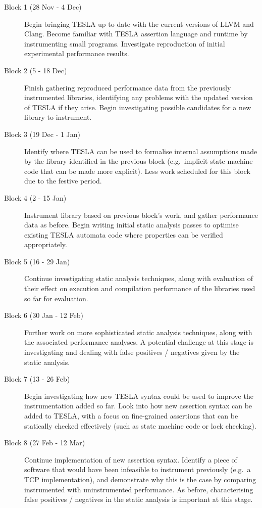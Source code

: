 \documentclass[11pt]{article}
\begin{document}
\begin{description}
  \item[Block 1 (28 Nov - 4 Dec)] Begin bringing TESLA up to date with the current
    versions of LLVM and Clang. Become familiar with TESLA assertion language and runtime
    by instrumenting small programs. Investigate reproduction of initial experimental
    performance results.

  \item[Block 2 (5 - 18 Dec)] Finish gathering reproduced performance data from the
    previously instrumented libraries, identifying any problems with the updated version
    of TESLA if they arise. Begin investigating possible candidates for a new library to
    instrument.

  \item[Block 3 (19 Dec - 1 Jan)] Identify where TESLA can be used to formalise internal
    assumptions made by the library identified in the previous block (e.g.\ implicit state
    machine code that can be made more explicit). Less work scheduled for this block due
    to the festive period.

  \item[Block 4 (2 - 15 Jan)] Instrument library based on previous block's work, and
    gather performance data as before. Begin writing initial static analysis passes to
    optimise existing TESLA automata code where properties can be verified appropriately.

  \item[Block 5 (16 - 29 Jan)] Continue investigating static analysis techniques, along
    with evaluation of their effect on execution and compilation performance of the
    libraries used so far for evaluation. 

  \item[Block 6 (30 Jan - 12 Feb)] Further work on more sophisticated static analysis
    techniques, along with the associated performance analyses. A potential challenge at
    this stage is investigating and dealing with false positives / negatives given by the
    static analysis.

  \item[Block 7 (13 - 26 Feb)] Begin investigating how new TESLA syntax could be used to
    improve the instrumentation added so far. Look into how new assertion syntax can be
    added to TESLA, with a focus on fine-grained assertions that can be statically checked
    effectively (such as state machine code or lock checking).

  \item[Block 8 (27 Feb - 12 Mar)] Continue implementation of new assertion syntax.
    Identify a piece of software that would have been infeasible to instrument previously
    (e.g.\ a TCP implementation), and demonstrate why this is the case by comparing
    instrumented with uninstrumented performance. As before, characterising false
    positives / negatives in the static analysis is important at this stage.


\end{description}
\end{document}
